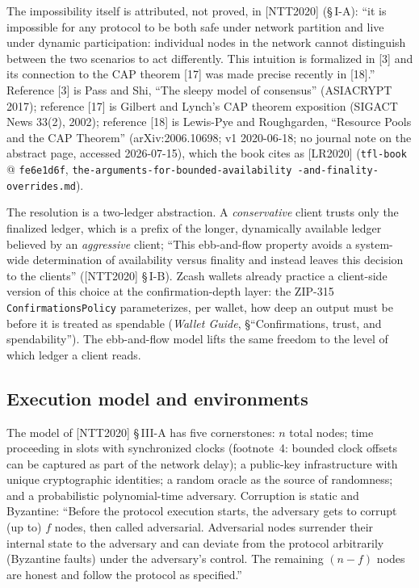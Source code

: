 \documentclass[11pt,a4paper]{article}
\theoremstyle{definition}
\begin{document}
The impossibility itself is attributed, not proved, in [NTT2020]
(\S\,I-A): ``it is impossible for any protocol to be both safe under
network partition and live under dynamic participation: individual nodes
in the network cannot distinguish between the two scenarios to act
differently. This intuition is formalized in [3] and its connection to the
CAP theorem [17] was made precise recently in [18].'' Reference [3] is
Pass and Shi, ``The sleepy model of consensus'' (ASIACRYPT 2017);
reference [17] is Gilbert and Lynch's CAP theorem exposition (SIGACT News
33(2), 2002); reference [18] is Lewis-Pye and Roughgarden, ``Resource
Pools and the CAP Theorem'' (arXiv:2006.10698; v1 2020-06-18; no journal
note on the abstract page, accessed 2026-07-15), which the book cites as
[LR2020] (\texttt{tfl-book} @ \texttt{fe6e1d6f},
\texttt{the-arguments-for-bounded-availability\allowbreak
-and-finality-overrides.md}).

The resolution is a two-ledger abstraction. A \emph{conservative} client
trusts only the finalized ledger, which is a prefix of the longer,
dynamically available ledger believed by an \emph{aggressive} client;
``This ebb-and-flow property avoids a system-wide determination of
availability versus finality and instead leaves this decision to the
clients'' ([NTT2020] \S\,I-B). Zcash wallets already practice a
client-side version of this choice at the confirmation-depth layer: the
ZIP-315 \texttt{ConfirmationsPolicy} parameterizes, per wallet, how deep
an output must be before it is treated as spendable (\emph{Wallet Guide},
\S``Confirmations, trust, and spendability''). The ebb-and-flow model
lifts the same freedom to the level of which ledger a client reads.

\subsection{Execution model and environments}\label{sec:xl-execution}

The model of [NTT2020] \S\,III-A has five cornerstones: $n$ total nodes;
time proceeding in slots with synchronized clocks (footnote~4: bounded
clock offsets can be captured as part of the network delay); a public-key
infrastructure with unique cryptographic identities; a random oracle as
the source of randomness; and a probabilistic polynomial-time adversary.
Corruption is static and Byzantine: ``Before the protocol execution
starts, the adversary gets to corrupt (up to) $f$ nodes, then called
adversarial. Adversarial nodes surrender their internal state to the
adversary and can deviate from the protocol arbitrarily (Byzantine faults)
under the adversary's control. The remaining $(n - f)$ nodes are honest
and follow the protocol as specified.''
\end{document}
